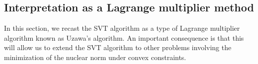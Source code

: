 \documentclass[conference,onecolumn,12pt]{IEEEtran}
\numberwithin{equation}{section}
\numberwithin{figure}{section}
\numberwithin{table}{section}
\theoremstyle{definition}
\newcommand{\anum}[1]{{\footnotesize{#1}\quad}}
\begin{document}
    


    
    

  \subsection{Interpretation as a Lagrange multiplier method}
\label{sec:uzawa}

In this section, we recast the SVT algorithm as a type of Lagrange
multiplier algorithm known as Uzawa's algorithm. An important
consequence is that this will allow us to extend the SVT algorithm to
other problems involving the minimization of the nuclear norm under
convex constraints.
\end{document}
